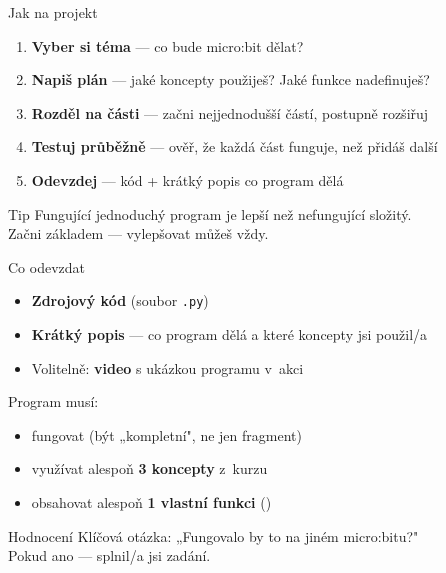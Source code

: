 \begin{frame}{Jak na projekt}

  \begin{enumerate}
    \item \textbf{Vyber si téma} — co bude micro:bit dělat?
    \item \textbf{Napiš plán} — jaké koncepty použiješ? Jaké funkce nadefinuješ?
    \item \textbf{Rozděl na části} — začni nejjednodušší částí, postupně rozšiřuj
    \item \textbf{Testuj průběžně} — ověř, že každá část funguje, než přidáš další
    \item \textbf{Odevzdej} — kód + krátký popis co program dělá
  \end{enumerate}

  \bigskip
  \begin{alertblock}{Tip}
    Fungující jednoduchý program je lepší než nefungující složitý.\\
    Začni základem — vylepšovat můžeš vždy.
  \end{alertblock}
\end{frame}

\begin{frame}{Co odevzdat}

  \begin{itemize}
    \item[\checkmark] \textbf{Zdrojový kód} (soubor \texttt{.py})
    \item[\checkmark] \textbf{Krátký popis} — co program dělá a které koncepty jsi použil/a
    \item[\checkmark] Volitelně: \textbf{video} s ukázkou programu v~akci
  \end{itemize}

  \bigskip
  Program musí:
  \begin{itemize}
    \item fungovat (být „kompletní", ne jen fragment)
    \item využívat alespoň \textbf{3 koncepty} z~kurzu
    \item obsahovat alespoň \textbf{1 vlastní funkci} ()
  \end{itemize}

  \bigskip
  \begin{block}{Hodnocení}
    Klíčová otázka: „Fungovalo by to na jiném micro:bitu?"\\
    Pokud ano — splnil/a jsi zadání.
  \end{block}
\end{frame}


